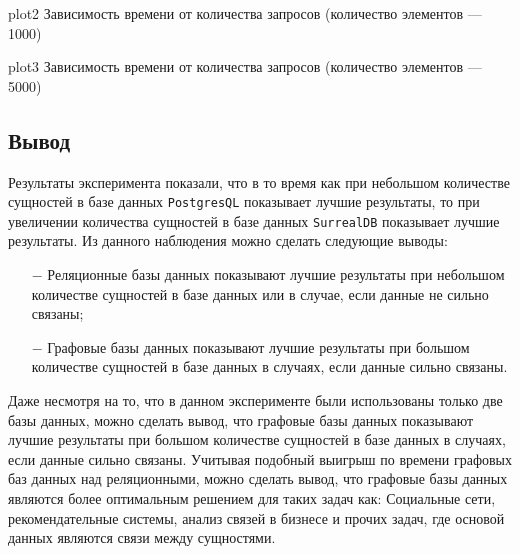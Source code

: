\img{100mm}
{plot2}
{Зависимость времени от количества запросов (количество элементов --- 1000)}

\img{100mm}
{plot3}
{Зависимость времени от количества запросов (количество элементов --- 5000)}

\clearpage

\subsection*{Вывод}
Результаты эксперимента показали, что в то время как при небольшом количестве сущностей в базе данных \texttt{PostgresQL} показывает лучшие результаты, то при увеличении количества сущностей в базе данных \texttt{SurrealDB} показывает лучшие результаты.
Из данного наблюдения можно сделать следующие выводы:
\begin{itemize}
    \item[$-$] Реляционные базы данных показывают лучшие результаты при небольшом количестве сущностей в базе данных или в случае, если данные не сильно связаны;
	\item[$-$] Графовые базы данных показывают лучшие результаты при большом количестве сущностей в базе данных в случаях, если данные сильно связаны.
\end{itemize}

Даже несмотря на то, что в данном эксперименте были использованы только две базы данных, можно сделать вывод, что графовые базы данных показывают лучшие результаты при большом количестве сущностей в базе данных в случаях, если данные сильно связаны.
Учитывая подобный выигрыш по времени графовых баз данных над реляционными, можно сделать вывод, что графовые базы данных являются более оптимальным решением для таких задач как:
Социальные сети, рекомендательные системы, анализ связей в бизнесе и прочих задач, где основой данных являются связи между сущностями.

